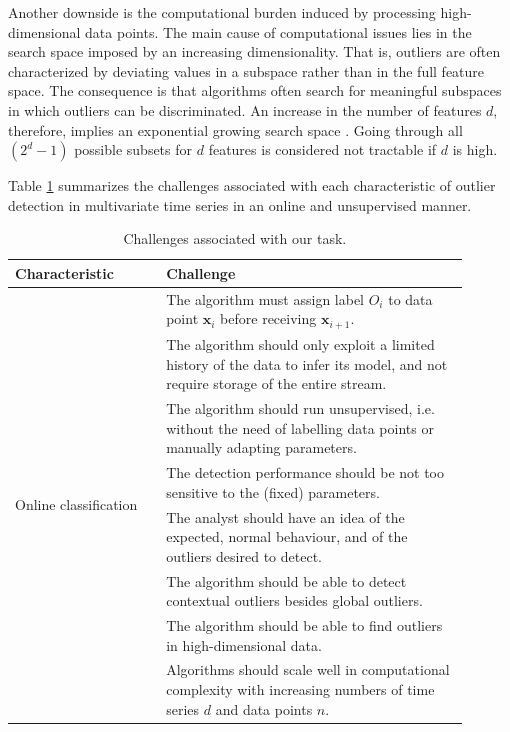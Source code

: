 Another downside is the computational burden induced by processing high-dimensional data points. The main cause of computational issues lies in the search space imposed by an increasing dimensionality. That is, outliers are often characterized by deviating values in a subspace rather than in the full feature space. The consequence is that algorithms often search for meaningful subspaces in which outliers can be discriminated. An increase in the number of features $d$, therefore, implies an exponential growing search space \cite{zimek2012survey}. Going through all $(2^d - 1)$ possible subsets for $d$ features is considered not tractable if $d$ is high.

Table \ref{tab:intro_characteristics} summarizes the challenges associated with each characteristic of outlier detection in multivariate time series in an online and unsupervised manner.

\begin{table}[h]
	\centering
	\caption{Challenges associated with our task.}
	\label{tab:intro_characteristics}
	\begin{tabular}{p{0.3\linewidth} p{0.6\linewidth}}
		\toprule
		\textbf{Characteristic}	&	\textbf{Challenge} \\
		\midrule
		\multirow{8}{*}{Online classification \cite{ahmad2017unsupervised,aggarwal2015outlier}} & The algorithm must assign label $O_i$ to data point ${\mathbf x}_i$ before receiving ${\mathbf x_{i+1}}$.\\[0.12cm]
		& The algorithm should only exploit a limited history of the data to infer its model, and not require storage of the entire stream.\\[0.12cm]
		& The algorithm should run unsupervised, i.e. without the need of labelling data points or manually adapting parameters.\\[0.12cm]
		& The detection performance should be not too sensitive to the (fixed) parameters.\\
		\midrule 
		\multirow{3}{*}{Outlier detection in} & The analyst should have an idea of the expected, normal behaviour, and of the outliers desired to detect. \\[0.12cm]
		time series \cite{chandola2009anomaly}& The algorithm should be able to detect contextual outliers besides global outliers. \\
		\midrule
		\multirow{4}{*}{High-dimensional data \cite{zimek2012survey}} & The algorithm should be able to find outliers in high-dimensional data. \\[0.12cm]
		& Algorithms should scale well in computational complexity with increasing numbers of time series $d$ and data points $n$.\\
		\bottomrule
	\end{tabular}
\end{table}



